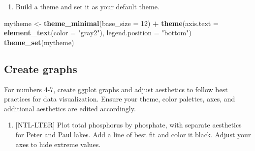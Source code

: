 \documentclass[
]{article}
\newenvironment{Shaded}{\begin{snugshade}}{\end{snugshade}}
\newcommand{\DataTypeTok}[1]{\textcolor[rgb]{0.13,0.29,0.53}{#1}}
\newcommand{\DecValTok}[1]{\textcolor[rgb]{0.00,0.00,0.81}{#1}}
\newcommand{\KeywordTok}[1]{\textcolor[rgb]{0.13,0.29,0.53}{\textbf{#1}}}
\newcommand{\NormalTok}[1]{#1}
\newcommand{\OperatorTok}[1]{\textcolor[rgb]{0.81,0.36,0.00}{\textbf{#1}}}
\newcommand{\StringTok}[1]{\textcolor[rgb]{0.31,0.60,0.02}{#1}}
\providecommand{\tightlist}{%
  \setlength{\itemsep}{0pt}\setlength{\parskip}{0pt}}
\begin{document}
\begin{enumerate}
\def\labelenumi{\arabic{enumi}.}
\setcounter{enumi}{2}
\tightlist
\item
  Build a theme and set it as your default theme.
\end{enumerate}

\begin{Shaded}
\begin{Highlighting}[]
\NormalTok{mytheme <-}\StringTok{ }\KeywordTok{theme_minimal}\NormalTok{(}\DataTypeTok{base_size =} \DecValTok{12}\NormalTok{) }\OperatorTok{+}
\StringTok{  }\KeywordTok{theme}\NormalTok{(}\DataTypeTok{axis.text =} \KeywordTok{element_text}\NormalTok{(}\DataTypeTok{color =} \StringTok{"gray2"}\NormalTok{), }
        \DataTypeTok{legend.position =} \StringTok{"bottom"}\NormalTok{)}
\KeywordTok{theme_set}\NormalTok{(mytheme)}
\end{Highlighting}
\end{Shaded}

\hypertarget{create-graphs}{%
\subsection{Create graphs}\label{create-graphs}}

For numbers 4-7, create ggplot graphs and adjust aesthetics to follow
best practices for data visualization. Ensure your theme, color
palettes, axes, and additional aesthetics are edited accordingly.

\begin{enumerate}
\def\labelenumi{\arabic{enumi}.}
\setcounter{enumi}{3}
\tightlist
\item
  {[}NTL-LTER{]} Plot total phosphorus by phosphate, with separate
  aesthetics for Peter and Paul lakes. Add a line of best fit and color
  it black. Adjust your axes to hide extreme values.
\end{enumerate}
\end{document}
